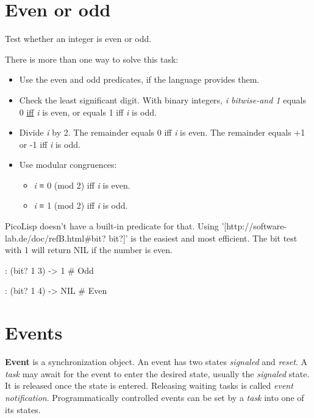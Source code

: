 \pagebreak{}
\section*{Even or odd}

Test whether an integer is even or odd.

There is more than one way to solve this task:

\begin{itemize}
\item
  Use the even and odd predicates, if the language provides them.
\item Check the least significant digit. With binary integers, \emph{i
    \emph{bitwise-and} 1} equals 0
  \href{http://en.wiktionary.org/wiki/iff}{iff} \emph{i} is even, or
  equals 1 iff \emph{i} is odd.
\item
  Divide \emph{i} by 2. The remainder equals 0 iff \emph{i} is even. The
  remainder equals +1 or -1 iff \emph{i} is odd.
\item
  Use modular congruences:

  \begin{itemize}
  \item
    \emph{i} ≡ 0 (mod 2) iff \emph{i} is even.
  \item
    \emph{i} ≡ 1 (mod 2) iff \emph{i} is odd.
  \end{itemize}
\end{itemize}


\begin{wideverbatim}

  PicoLisp doesn't have a built-in predicate for that. Using
  '[http://software-lab.de/doc/refB.html#bit? bit?]' is the easiest
  and most efficient. The bit test with 1 will return NIL if the
  number is even.

: (bit? 1 3)
-> 1  # Odd

: (bit? 1 4)
-> NIL  # Even

\end{wideverbatim}

\pagebreak{}
\section*{Events}

\textbf{Event} is a synchronization object. An event has two states
\emph{signaled} and \emph{reset}. A \emph{task} may await for the
event to enter the desired state, usually the \emph{signaled} state.
It is released once the state is entered. Releasing waiting tasks is
called \emph{event notification}. Programmatically controlled events
can be set by a \emph{task} into one of its states.

